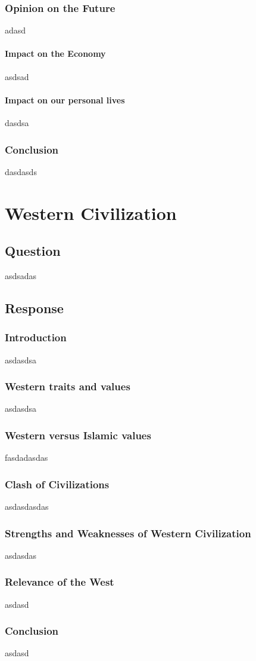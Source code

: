 \documentclass[12pt]{report}
\begin{document}
\section{Opinion on the Future}
    adasd

\subsection{Impact on the Economy}
    asdsad

\subsection{Impact on our personal lives}
    dasdsa

\section{Conclusion}
   dasdasds

\part{Western Civilization}
\chapter{Question}
    asdsadas

\chapter{Response}
\section{Introduction}
    asdasdsa

\section{Western traits and values}
    asdasdsa

\section{Western versus Islamic values}
    fasdadasdas

\section{Clash of Civilizations}
    asdasdasdas

\section{Strengths and Weaknesses of Western Civilization}
    asdasdas

\section{Relevance of the West}
    asdasd

\section{Conclusion}
    asdasd
\end{document}
